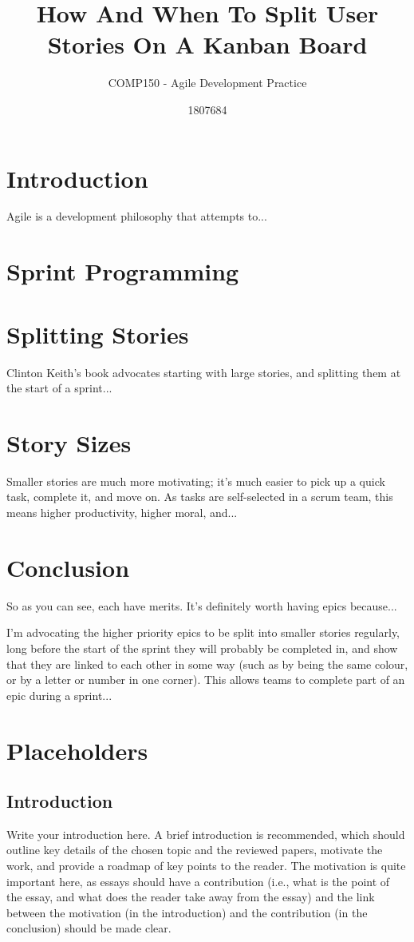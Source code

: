 \documentclass{scrartcl}
\title{How And When To Split User Stories On A Kanban Board}
\subtitle{COMP150 - Agile Development Practice}
\author{1807684}
\begin{document}
\maketitle


\section{Introduction}
Agile is a development philosophy that attempts to...%

\section{Sprint Programming}


\section{Splitting Stories}
Clinton Keith's book \cite{Keith} advocates starting with large stories, and splitting them at the start of a sprint...%

\section{Story Sizes}
Smaller stories are much more motivating; it's much easier to pick up a quick task, complete it, and move on. As tasks are self-selected in a scrum team, this means higher productivity, higher moral, and...%

\section{Conclusion}
So as you can see, each have merits. It's definitely worth having epics because...%

I'm advocating the higher priority epics to be split into smaller stories regularly, long before the start of the sprint they will probably be completed in, and show that they are linked to each other in some way (such as by being the same colour, or by a letter or number in one corner). This allows teams to complete part of an epic during a sprint...%


\section{Placeholders}
\subsection{Introduction}
Write your introduction here. A brief introduction is recommended, which should outline key details of the chosen topic and the reviewed papers, motivate the work, and provide a roadmap of key points to the reader. The motivation is quite important here, as essays should have a contribution (i.e., what is the point of the essay, and what does the reader take away from the essay) and the link between the motivation (in the introduction) and the contribution (in the conclusion) should be made clear.
\end{document}

